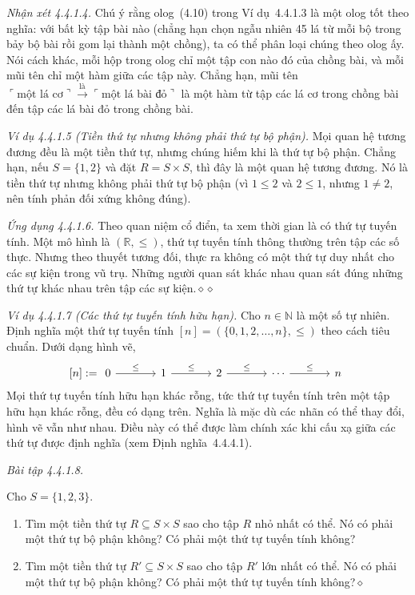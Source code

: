 \noindent\textit{Nhận xét 4.4.1.4.} Chú ý rằng olog~(4.10) trong Ví dụ~4.4.1.3 là một olog tốt theo nghĩa: với bất kỳ tập bài nào (chẳng hạn chọn ngẫu nhiên 45 lá từ mỗi bộ trong bảy bộ bài rồi gom lại thành một chồng), ta có thể phân loại chúng theo olog ấy. Nói cách khác, mỗi hộp trong olog chỉ một tập con nào đó của chồng bài, và mỗi mũi tên chỉ một hàm giữa các tập này. Chẳng hạn, mũi tên $\ulcorner\text{một lá cơ}\urcorner\xrightarrow{\text{là}}\ulcorner\text{một lá bài đỏ}\urcorner$ là một hàm từ tập các lá cơ trong chồng bài đến tập các lá bài đỏ trong chồng bài.

\noindent\textit{Ví dụ 4.4.1.5 (Tiền thứ tự nhưng không phải thứ tự bộ phận).} Mọi quan hệ tương đương đều là một tiền thứ tự, nhưng chúng hiếm khi là thứ tự bộ phận. Chẳng hạn, nếu $S=\{1,2\}$ và đặt $R=S\times S$, thì đây là một quan hệ tương đương. Nó là tiền thứ tự nhưng không phải thứ tự bộ phận (vì $1\le2$ và $2\le1$, nhưng $1\ne2$, nên tính phản đối xứng không đúng).

\noindent\textit{Ứng dụng 4.4.1.6.} Theo quan niệm cổ điển, ta xem thời gian là có thứ tự tuyến tính. Một mô hình là $(\mathbb{R},\le)$, thứ tự tuyến tính thông thường trên tập các số thực. Nhưng theo thuyết tương đối, thực ra không có một thứ tự duy nhất cho các sự kiện trong vũ trụ. Những người quan sát khác nhau quan sát đúng những thứ tự khác nhau trên tập các sự kiện.\hfill$\diamond\diamond$

\noindent\textit{Ví dụ 4.4.1.7 (Các thứ tự tuyến tính hữu hạn).} Cho $n\in\mathbb{N}$ là một số tự nhiên. Định nghĩa một thứ tự tuyến tính $[n]=(\{0,1,2,\ldots,n\},\le)$ theo cách tiêu chuẩn. Dưới dạng hình vẽ,
\[
[n]:=\begin{tikzcd}[column sep=large]
0\arrow[r,"\le"]&1\arrow[r,"\le"]&2\arrow[r,"\le"]&\cdots\arrow[r,"\le"]&n
\end{tikzcd}
\]
Mọi thứ tự tuyến tính hữu hạn khác rỗng, tức thứ tự tuyến tính trên một tập hữu hạn khác rỗng, đều có dạng trên. Nghĩa là mặc dù các nhãn có thể thay đổi, hình vẽ vẫn như nhau. Điều này có thể được làm chính xác khi cấu xạ giữa các thứ tự được định nghĩa (xem Định nghĩa~4.4.4.1).

\noindent\textit{Bài tập 4.4.1.8.}\keepwithnext

Cho $S=\{1,2,3\}$.
\begin{enumerate}[label=\alph*.]
\item Tìm một tiền thứ tự $R\subseteq S\times S$ sao cho tập $R$ nhỏ nhất có thể. Nó có phải một thứ tự bộ phận không? Có phải một thứ tự tuyến tính không?
\item Tìm một tiền thứ tự $R'\subseteq S\times S$ sao cho tập $R'$ lớn nhất có thể. Nó có phải một thứ tự bộ phận không? Có phải một thứ tự tuyến tính không?\nobreak\hfill$\diamond$
\end{enumerate}

